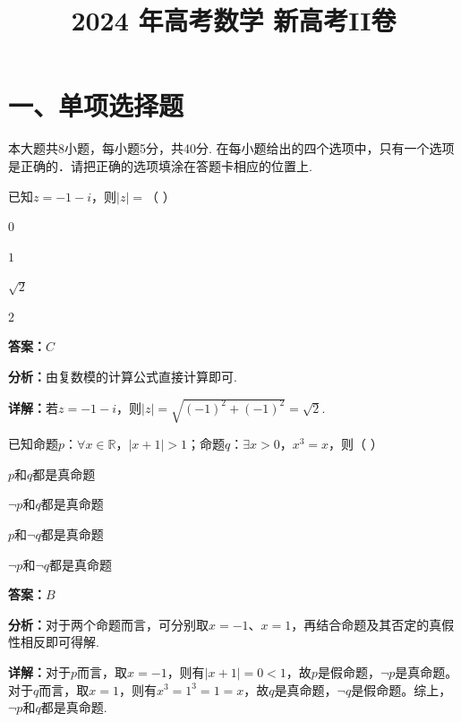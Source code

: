 ﻿\title{2024 年高考数学 新高考II卷}
\date{}
\maketitle

\section*{一、单项选择题}
本大题共8小题，每小题5分，共40分. 在每小题给出的四个选项中，只有一个选项是正确的．请把正确的选项填涂在答题卡相应的位置上.

\begin{question}[points=5]
已知$z = -1 - i$，则$|z| =$（ ）
\begin{choices}
  \item $0$
  \item $1$
  \item $\sqrt{2}$
  \item $2$
\end{choices}
\begin{solution}
\textbf{答案：}$C$

\textbf{分析：}由复数模的计算公式直接计算即可.

\textbf{详解：}若$z = -1 - i$，则$|z| = \sqrt{(-1)^2 + (-1)^2} = \sqrt{2}$.
\end{solution}
\end{question}

\begin{question}[points=5]
已知命题$p$：$\forall x \in \mathbb{R}$，$|x+1| > 1$；命题$q$：$\exists x > 0$，$x^3 = x$，则（ ）
\begin{choices}
  \item $p$和$q$都是真命题
  \item $\neg p$和$q$都是真命题
  \item $p$和$\neg q$都是真命题
  \item $\neg p$和$\neg q$都是真命题
\end{choices}
\begin{solution}
\textbf{答案：}$B$

\textbf{分析：}对于两个命题而言，可分别取$x=-1$、$x=1$，再结合命题及其否定的真假性相反即可得解.

\textbf{详解：}对于$p$而言，取$x=-1$，则有$|x+1|=0 < 1$，故$p$是假命题，$\neg p$是真命题。对于$q$而言，取$x=1$，则有$x^3=1^3=1=x$，故$q$是真命题，$\neg q$是假命题。综上，$\neg p$和$q$都是真命题.
\end{solution}
\end{question}

